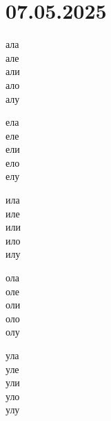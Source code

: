 \documentclass[a5paper,12pt]{article}
\begin{document}
\section{07.05.2025}
\noindent
\begin{minipage}[t]{0.18\textwidth}
ала\\ але\\ али\\ ало\\ алу
\end{minipage}
\hfill
\begin{minipage}[t]{0.18\textwidth}
ела\\ еле\\ ели\\ ело\\ елу
\end{minipage}
\hfill
\begin{minipage}[t]{0.18\textwidth}
ила\\ иле\\ или\\ ило\\ илу
\end{minipage}
\hfill 
\begin{minipage}[t]{0.18\textwidth}
ола\\ оле\\ оли\\ оло\\ олу
\end{minipage}
\hfill 
\begin{minipage}[t]{0.18\textwidth}
ула\\ уле\\ ули\\ уло\\ улу
\end{minipage}
\end{document}
